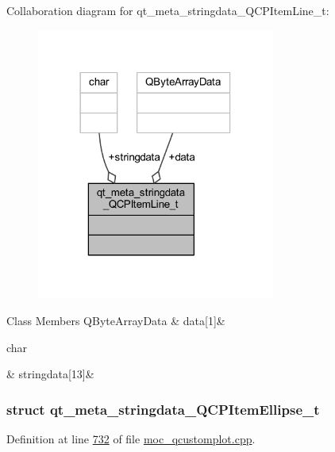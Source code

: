 Collaboration diagram for qt\+\_\+meta\+\_\+stringdata\+\_\+\+Q\+C\+P\+Item\+Line\+\_\+t\+:
\nopagebreak
\begin{figure}[H]
\begin{center}
\leavevmode
\includegraphics[width=222pt]{d8/df1/a00174}
\end{center}
\end{figure}
\begin{DoxyFields}{Class Members}
\hypertarget{a00016_a02b269c84618a73b8cefdb4c4ae888c6}{Q\+Byte\+Array\+Data}\label{a00016_a02b269c84618a73b8cefdb4c4ae888c6}
&
data\mbox{[}1\mbox{]}&
\\
\hline

\hypertarget{a00016_ac705c65b9062c112f8ff0dd2a2915160}{char}\label{a00016_ac705c65b9062c112f8ff0dd2a2915160}
&
stringdata\mbox{[}13\mbox{]}&
\\
\hline

\end{DoxyFields}
\label{df/d98/a00107}
\hypertarget{a00016_df/d98/a00107}{}
\subsubsection{struct qt\+\_\+meta\+\_\+stringdata\+\_\+\+Q\+C\+P\+Item\+Ellipse\+\_\+t}


Definition at line \hyperlink{a00016_source_l00732}{732} of file \hyperlink{a00016_source}{moc\+\_\+qcustomplot.\+cpp}.



